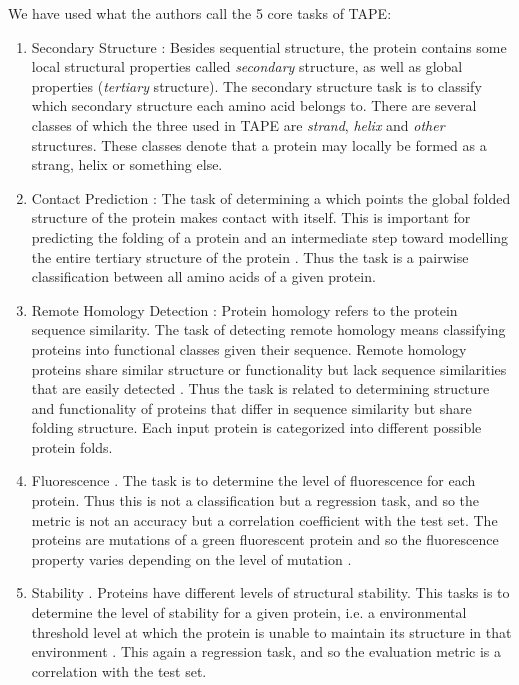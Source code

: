 \documentclass[a4paper,12pt]{article}
\begin{document}
We have used what the authors call the 5 core tasks of TAPE:
\begin{enumerate}
    \item Secondary Structure \cite{ pdb, casp, netsurfp}: Besides sequential structure, the protein contains some local structural properties called \textit{secondary} structure, as well as global properties (\textit{tertiary} structure). The secondary structure task is to classify which secondary structure each amino acid belongs to. There are several classes of which the three used in TAPE are \textit{strand}, \textit{helix} and \textit{other} structures. These classes denote that a protein may locally be formed as a strang, helix or something else.
    
    \item Contact Prediction \cite{scop, proteinnet}: The task of determining a which points the global folded structure of the protein makes contact with itself. This is important for predicting the folding of a protein and an intermediate step toward modelling the entire tertiary structure of the protein \cite{hamilton2008introduction}. Thus the task is a pairwise classification between all amino acids of a given protein.
    
    \item Remote Homology Detection \cite{scop}: Protein homology refers to the protein sequence similarity. The task of detecting remote homology means classifying proteins into functional classes given their sequence. Remote homology proteins share similar structure or functionality but lack sequence similarities that are easily detected \cite{chen2016protein}. Thus the task is related to determining structure and functionality of proteins that differ in sequence similarity but share folding structure. Each input protein is categorized into different possible protein folds.
    
    \item Fluorescence \cite{sarkisyan2016}. The task is to determine the level of fluorescence for each protein. Thus this is not a classification but a regression task, and so the metric is not an accuracy but a correlation coefficient with the test set. The proteins are mutations of a green fluorescent protein and so the fluorescence property varies depending on the level of mutation \cite{tape2019}.
    
    \item Stability \cite{rocklin2017}. Proteins have different levels of structural stability. This tasks is to determine the level of stability for a given protein, i.e. a environmental threshold level at which the protein is unable to maintain its structure in that environment \cite{tape2019}. This again a regression task, and so the evaluation metric is a correlation with the test set.
\end{enumerate}
\end{document}
